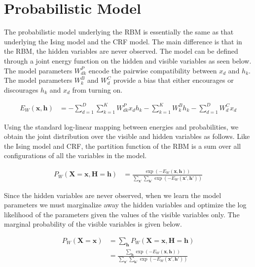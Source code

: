 \documentclass[11pt]{article}
\newcommand{\mbf}[1]{{\mathbf{#1}}}
\begin{document}
\section{Probabilistic Model} The probabilistic model underlying the RBM is essentially the same as that underlying the Ising model and the CRF model. The main difference is that in the RBM, the hidden variables are never observed. The model can be defined through a joint energy function on the hidden and visible variables as seen below. The model parameters $W^P_{dk}$ encode the
pairwise compatibility between $x_d$ and $h_k$. The model parameters $W^B_k$ and $W^C_d$
provide a bias that either encourages or discourages $h_k$ and $x_d$ from turning on.

\begin{align}
\label{energy}
E_W(\mbf{x},\mbf{h})&=
-\sum_{d=1}^D\sum_{k=1}^K W^P_{dk}x_dh_k - \sum_{k=1}^KW^B_k h_k - \sum_{d=1}^D W^C_d x_d
\end{align}

Using the standard log-linear mapping between energies and probabilities, we obtain the joint distribution over the visible and hidden variables as follows. Like the Ising model and CRF, the partition function of the RBM is a sum over all configurations of all the variables in the model.

\begin{align}
\label{joint-prob}
P_W(\mbf{X}=\mbf{x},\mbf{H}=\mbf{h})&= \frac{\exp(-E_W(\mbf{x},\mbf{h}))}
{\sum_{\mbf{x}'}\sum_{\mbf{h}'}\exp(-E_W(\mbf{x}',\mbf{h}'))}
\end{align}

Since the hidden variables are never observed, when we learn the model parameters we must marginalize away the hidden variables and optimize the log likelihood of the parameters given the values of the visible variables only. The marginal probability of the visible variables is given below.

\begin{align}
\label{marginal-prob}
P_W(\mbf{X}=\mbf{x})&= \sum_{\mbf{h}}P_W(\mbf{X}=\mbf{x},\mbf{H}=\mbf{h}) \\
&=\frac{\sum_{\mbf{h}}\exp(-E_W(\mbf{x},\mbf{h}))}
{\sum_{\mbf{x}'}\sum_{\mbf{h}'}\exp(-E_W(\mbf{x}',\mbf{h}'))}
\end{align}
\end{document}
